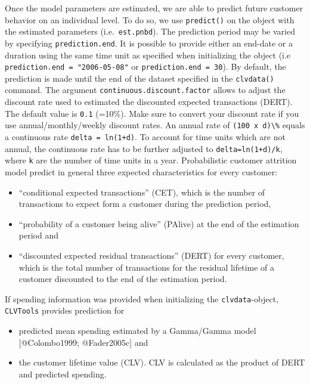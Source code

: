 \documentclass[
]{article}
\providecommand{\tightlist}{%
  \setlength{\itemsep}{0pt}\setlength{\parskip}{0pt}}
\begin{document}
Once the model parameters are estimated, we are able to predict future
customer behavior on an individual level. To do so, we use
\texttt{predict()} on the object with the estimated parameters
(i.e.~\texttt{est.pnbd}). The prediction period may be varied by
specifying \texttt{prediction.end}. It is possible to provide either an
end-date or a duration using the same time unit as specified when
initializing the object (i.e \texttt{prediction.end\ =\ "2006-05-08"} or
\texttt{prediction.end\ =\ 30}). By default, the prediction is made
until the end of the dataset specified in the \texttt{clvdata()}
command. The argument \texttt{continuous.discount.factor} allows to
adjust the discount rate used to estimated the discounted expected
transactions (DERT). The default value is \texttt{0.1} (=10\%). Make
sure to convert your discount rate if you use annual/monthly/weekly
discount rates. An annual rate of \texttt{(100\ x\ d)\textbackslash{}\%}
equals a continuous rate \texttt{delta\ =\ ln(1+d)}. To account for time
units which are not annual, the continuous rate has to be further
adjusted to \texttt{delta=ln(1+d)/k}, where \texttt{k} are the number of
time units in a year. Probabilistic customer attrition model predict in
general three expected characteristics for every customer:

\begin{itemize}
\tightlist
\item
  ``conditional expected transactions'' (CET), which is the number of
  transactions to expect form a customer during the prediction period,
\item
  ``probability of a customer being alive'' (PAlive) at the end of the
  estimation period and
\item
  ``discounted expected residual transactions'' (DERT) for every
  customer, which is the total number of transactions for the residual
  lifetime of a customer discounted to the end of the estimation period.
\end{itemize}

If spending information was provided when initializing the
\texttt{clvdata}-object, \texttt{CLVTools} provides prediction for

\begin{itemize}
\tightlist
\item
  predicted mean spending estimated by a Gamma/Gamma model
  {[}@Colombo1999; @Fader2005c{]} and
\item
  the customer lifetime value (CLV). CLV is calculated as the product of
  DERT and predicted spending.
\end{itemize}
\end{document}
